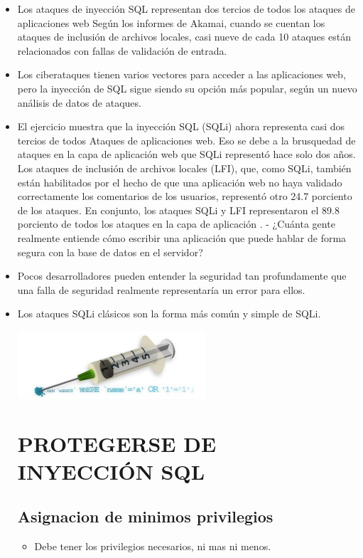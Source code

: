 \documentclass[%
 reprint,
 amsmath,amssymb,
 aps,
]{revtex4-1}
\begin{document}
\begin{itemize}
\begin{center}
\end{center}	
	\item Los ataques de inyección SQL representan dos tercios de todos los ataques de aplicaciones web
Según los informes de Akamai, cuando se cuentan los ataques de inclusión de archivos locales, casi nueve de cada 10 ataques están relacionados con fallas de validación de entrada.
           \item Los ciberataques tienen varios vectores para acceder a las aplicaciones web, pero la inyección de SQL sigue siendo su opción más popular, según un nuevo análisis de datos de ataques.
           \item El ejercicio muestra que la inyección SQL (SQLi) ahora representa casi dos tercios   de todos Ataques de aplicaciones web. Eso se debe a la brusquedad de ataques en la  capa de aplicación web que SQLi representó hace solo dos años.
Los ataques de inclusión de archivos locales (LFI), que, como SQLi, también están habilitados por el hecho de que una aplicación web no haya validado correctamente los comentarios de los usuarios, representó otro 24.7 porciento de los ataques. En conjunto, los ataques SQLi y LFI representaron el 89.8 porciento de todos los ataques en la capa de aplicación .
- ¿Cuánta gente realmente entiende cómo escribir una aplicación que puede hablar de forma segura con la base de datos en el servidor?
 \item Pocos desarrolladores pueden entender la seguridad tan profundamente que una falla de seguridad realmente representaría un error para ellos.
\item  Los ataques SQLi clásicos son la forma más común y simple de SQLi.
\begin{center}
	\includegraphics[width=7cm]{./Imagenes/3}
\end{center}	
\section{PROTEGERSE DE INYECCIÓN SQL}
\subsection {Asignacion de minimos privilegios}
\begin{itemize}
\item Debe tener los privilegios necesarios, ni mas ni menos.
\end{itemize}

\end{itemize}
\end{document}
